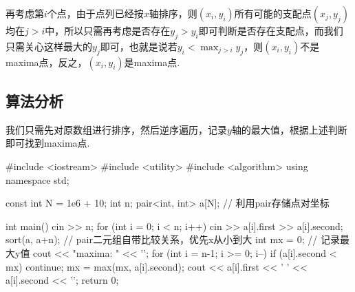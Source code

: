 \documentclass[12pt, a4paper, oneside]{ctexart}
\numberwithin{equation}{section}  %
\begin{document}
再考虑第$i$个点，由于点列已经按$x$轴排序，则$(x_i,y_i)$所有可能的支配点$(x_j,y_j)$均在$j>i$中，所以只需再考虑是否存在$y_j > y_i$即可判断是否存在支配点，而我们只需关心这样最大的$y_j$即可，也就是说若$y_i < \max_{j > i}y_j$，则$(x_i,y_i)$不是maxima点，反之，$(x_i,y_i)$是maxima点.
\subsection{算法分析}
我们只需先对原数组进行排序，然后逆序遍历，记录$y$轴的最大值，根据上述判断即可找到maxima点.
\begin{cppcode}
#include <iostream>
#include <utility>
#include <algorithm>
using namespace std;

const int N = 1e6 + 10;
int n;
pair<int, int> a[N];  // 利用pair存储点对坐标

int main() {
    cin >> n;
    for (int i = 0; i < n; i++) cin >> a[i].first >> a[i].second;
    sort(a, a+n);  // pair二元组自带比较关系，优先x从小到大
    int mx = 0;  // 记录最大y值
    cout << "maxima: " << '\n';
    for (int i = n-1; i >= 0; i--) {
        if (a[i].second < mx) continue;
        mx = max(mx, a[i].second);
        cout << a[i].first << ' ' << a[i].second << '\n';
    }
    return 0;
} 
\end{cppcode}
\end{document}
